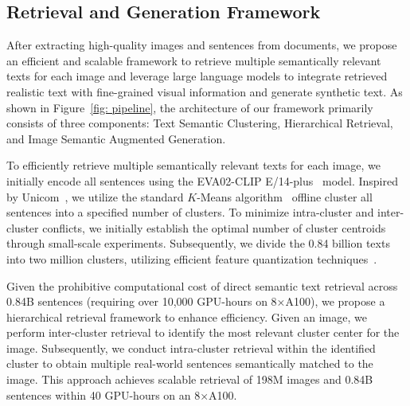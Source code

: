 
 

\subsection{\bf Retrieval and Generation Framework} 
After extracting high-quality images and sentences from documents, we propose an efficient and scalable framework to retrieve multiple semantically relevant texts for each image and leverage large language models to integrate retrieved realistic text with fine-grained visual information and generate synthetic text. As shown in Figure~\ref{fig: pipeline}, the architecture of our framework primarily consists of three components: Text Semantic Clustering, Hierarchical Retrieval, and Image Semantic Augmented Generation.



 To efficiently retrieve multiple semantically relevant texts for each image, we initially encode all sentences using the EVA02-CLIP E/14-plus~\cite{eva_clip} model. Inspired by Unicom~\cite{unicom}, we utilize the standard $K$-Means algorithm~\cite{kmeans} offline cluster all sentences into a specified number of clusters. To minimize intra-cluster and inter-cluster conflicts, we initially establish the optimal number of cluster centroids through small-scale experiments. Subsequently, we divide the 0.84 billion texts into two million clusters, utilizing efficient feature quantization techniques~\cite{johnson2019billion}.

 Given the prohibitive computational cost of direct semantic text retrieval across 0.84B sentences (requiring over 10,000 GPU-hours on 8×A100), we propose a hierarchical retrieval framework to enhance efficiency. Given an image, we perform inter-cluster retrieval to identify the most relevant cluster center for the image. Subsequently, we conduct intra-cluster retrieval within the identified cluster to obtain multiple real-world sentences semantically matched to the image. This approach achieves scalable retrieval of 198M images and 0.84B sentences within 40 GPU-hours on an 8×A100.


